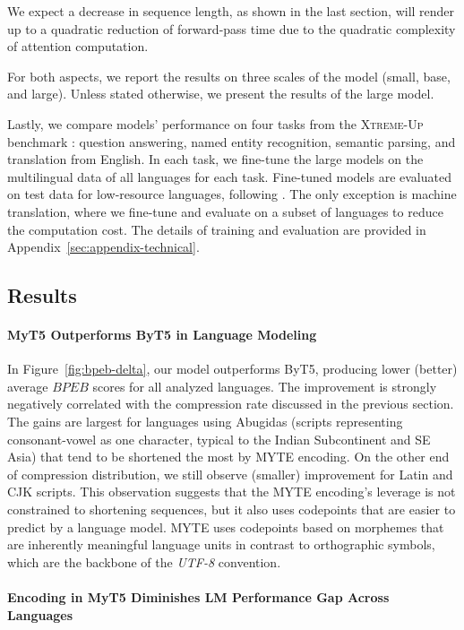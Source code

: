 We expect a decrease in sequence length, as shown in the last section, will render up to a quadratic reduction of forward-pass time due to the quadratic complexity of attention computation.

For both aspects, we report the results on three scales of the model (small, base, and large). Unless stated otherwise, we present the results of the large model. 

Lastly, we compare models' performance on four tasks from the \textsc{Xtreme-Up} benchmark \cite{ruder_xtreme-up_2023}: question answering, named entity recognition, semantic parsing, and translation from English. In each task, we fine-tune the large models on the multilingual data of all languages for each task. Fine-tuned models are evaluated on test data for low-resource languages, following \citet{ruder_xtreme-up_2023}.
The only exception is machine translation, where we fine-tune and evaluate on a subset of languages to reduce the computation cost. The details of training and evaluation are provided in Appendix~\ref{sec:appendix-technical}.

\subsection{Results}
\paragraph{MyT5 Outperforms ByT5 in Language Modeling} In Figure~\ref{fig:bpeb-delta}, our model outperforms ByT5, producing lower (better) average $BPEB$ scores for all analyzed languages. The improvement is strongly negatively correlated with the compression rate discussed in the previous section. The gains are largest for languages using Abugidas (scripts representing consonant-vowel as one character, typical to the Indian Subcontinent and SE Asia) that tend to be shortened the most by \textsc{MYTE} encoding. On the other end of compression distribution, we still observe (smaller) improvement for Latin and CJK scripts. This observation suggests that the \textsc{MYTE} encoding's leverage is not constrained to shortening sequences, but it also uses codepoints that are easier to predict by a language model. 
\textsc{MYTE} uses codepoints based on morphemes that are inherently meaningful language units in contrast to orthographic symbols, which are the backbone of the \emph{UTF-8} convention.

\paragraph{Encoding in MyT5 Diminishes LM Performance Gap Across Languages}

